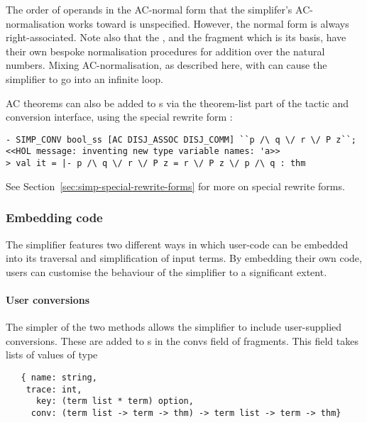 {
The order of operands in the AC-normal form that the simplifer's
AC-normalisation works toward is unspecified.  However, the normal
form is always right-associated.  Note also that the 
\simpset, and the  fragment which is its basis, have
their own bespoke normalisation procedures for addition over the
natural numbers.  Mixing AC-normalisation, as described here, with
 can cause the simplifier to go into an infinite loop.

AC theorems can also be added to \simpset{}s via the theorem-list part
of the tactic and conversion interface, using the special rewrite form
:
\begin{session}
\begin{hol}
\begin{verbatim}
- SIMP_CONV bool_ss [AC DISJ_ASSOC DISJ_COMM] ``p /\ q \/ r \/ P z``;
<<HOL message: inventing new type variable names: 'a>>
> val it = |- p /\ q \/ r \/ P z = r \/ P z \/ p /\ q : thm
\end{verbatim}
\end{hol}
\end{session}
See Section~\ref{sec:simp-special-rewrite-forms} for more on special
rewrite forms.

\subsubsection{Embedding code}
\label{sec:simp-embedding-code}

The simplifier features two different ways in which user-code can be
embedded into its traversal and simplification of input terms.  By
embedding their own code, users can customise the behaviour of the
simplifier to a significant extent.

\paragraph{User conversions}
The simpler of the two methods allows the simplifier to include
user-supplied conversions.  These are added to \simpset{}s in the
{convs} field of \simpset{} fragments.  This field takes lists of
values of type
\begin{hol}
\begin{verbatim}
   { name: string,
    trace: int,
      key: (term list * term) option,
     conv: (term list -> term -> thm) -> term list -> term -> thm}
\end{verbatim}
\end{hol}

}
